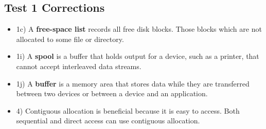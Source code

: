 \documentclass{article}
\begin{document}
\begin{center}
    \section*{Test 1 Corrections}
\end{center}

\begin{itemize}
\item 1c) A \textbf{free-space list} records all free disk blocks. Those blocks which are not allocated to some file or directory.
\item 1i) A \textbf{spool} is a buffer that holds output for a device, such as a printer, that cannot accept interleaved data streams.
\item 1j) A \textbf{buffer} is a memory area that stores data while they are transferred between two devices or between a device and an application.
\item 4) Contiguous allocation is beneficial because it is easy to access. Both sequential and direct access can use contiguous allocation.
\end{itemize}
\end{document}
